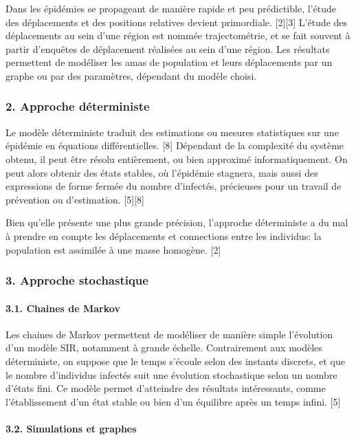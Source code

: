 \documentclass{article}
\begin{document}
Dans les épidémies se propageant de manière rapide et peu prédictible, l'étude des déplacements et des positions relatives devient primordiale. [2][3] L'étude des déplacements au sein d'une région est nommée trajectométrie, et se fait souvent à partir d'enquêtes de déplacement réalisées au sein d'une région. Les résultats permettent de modéliser les amas de population et leurs déplacements par un graphe ou par des paramètres, dépendant du modèle choisi.

\subsubsection*{2. Approche déterministe}

Le modèle déterministe traduit des estimations ou mesures statistiques sur une épidémie en équations différentielles. [8] Dépendant de la complexité du système obtenu, il peut être résolu entièrement, ou bien approximé informatiquement. On peut alors obtenir des états stables, où l'épidémie stagnera, mais aussi des expressions de forme fermée du nombre d'infectés, précieuses pour un travail de prévention ou d'estimation. [5][8]

Bien qu'elle présente une plus grande précision, l'approche déterministe a du mal à prendre en compte les déplacements et connections entre les individus: la population est assimilée à une masse homogène. [2]

\subsubsection*{3. Approche stochastique}

\paragraph{3.1. Chaines de Markov}\mbox{}\newline

Les chaines de Markov permettent de modéliser de manière simple l'évolution d'un modèle SIR, notamment à grande échelle. Contrairement aux modèles déterministe, on suppose que le temps s'écoule selon des instants discrets, et que le nombre d'individus infectés suit une évolution stochastique selon un nombre d'états fini. Ce modèle permet d'atteindre des résultats intéressants, comme l'établissement d'un état stable ou bien d'un équilibre après un temps infini. [5]

\paragraph{3.2. Simulations et graphes}\mbox{}\newline
\end{document}
